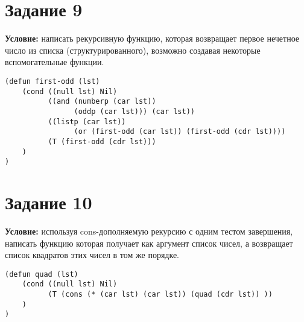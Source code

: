 \section{Задание 9}

\textbf{Условие:} написать рекурсивную функцию, которая возвращает первое нечетное число из списка (структурированного), возможно создавая некоторые вспомогательные функции.


\begin{lstlisting}
(defun first-odd (lst)
    (cond ((null lst) Nil)
          ((and (numberp (car lst)) 
                (oddp (car lst))) (car lst))
          ((listp (car lst)) 
                (or (first-odd (car lst)) (first-odd (cdr lst))))
          (T (first-odd (cdr lst)))
    )
)
\end{lstlisting}



\section{Задание 10}

\textbf{Условие:} используя cons-дополняемую рекурсию с одним тестом завершения, написать функцию которая получает как аргумент список чисел, а возвращает список квадратов этих чисел в том же порядке.


\begin{lstlisting}
(defun quad (lst)
    (cond ((null lst) Nil)
          (T (cons (* (car lst) (car lst)) (quad (cdr lst)) ))
    )
)
\end{lstlisting}
